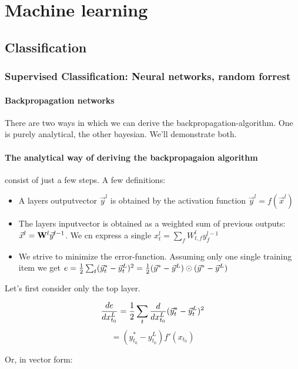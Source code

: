 \section{Machine learning}


\subsection{Classification}

\subsubsection{Supervised Classification: Neural networks, random forrest}

\paragraph{Backpropagation networks}

There are two ways in which we can derive the backpropagation-algorithm. One is purely analytical, the other bayesian. We'll demonstrate both. 

\paragraph{The analytical way of deriving the backpropagaion algorithm} consist of just a few steps. 
A few definitions: 

\begin{itemize}
	\item A layers outputvector $\vec{y}^l$ is obtained by the activation function $\vec{y}^l = f(\vec{x}^l) $
	\item The layers inputvector is obtained as a weighted sum of previous outputs: $\vec{x}^l = \mathbf{W}^l \vec{y}^{l-1} $. We cn express a single $x_t^l = \sum_f W_{t,f}^l y_f^{l-1}$
	\item We strive to minimize the error-function. Assuming only one single training item we get $e = \frac{1}{2} \sum_t (\vec{y}^*_t - \vec{y}^L_t)^2 = \frac{1}{2} (\vec{y}^* - \vec{y}^L) \odot (\vec{y}^* - \vec{y}^L) $
\end{itemize}

Let's first consider only the top layer. 

$$   \frac{ \mathop{de} }{ \mathop{dx_{t_0}^L} }  = \frac{1}{2} \sum_t  \frac{ \mathop{d} }{ \mathop{dx_{t_0}^L} }  (\vec{y}^*_t - \vec{y}^L_t)^2 $$
$$ = (y_{t_0}^* - y_{t_0}^L) f'(x_{t_0}) $$

Or, in vector form: 

